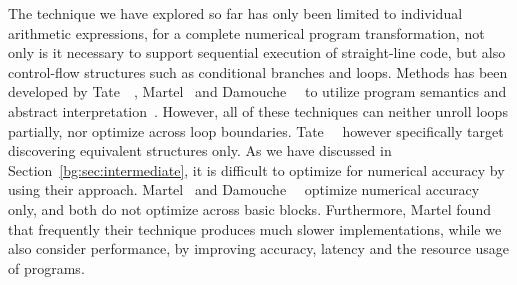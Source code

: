 The technique we have explored so far has only been limited to individual
arithmetic expressions, for a complete numerical program transformation, not
only is it necessary to support sequential execution of straight-line code,
but also control-flow structures such as conditional branches and loops.
Methods has been developed by Tate~\etal~\cite{tate09}, Martel~\cite{martel09}
and Damouche~\etal~\cite{damouche15} to utilize program semantics and
abstract interpretation~\cite{cousot77}.  However, all of these techniques
can neither unroll loops partially, nor optimize across loop boundaries.
Tate~\etal~\cite{tate09} however specifically target discovering equivalent
structures only.  As we have discussed in Section~\ref{bg:sec:intermediate},
it is difficult to optimize for numerical accuracy by using their approach.
Martel~\cite{martel09} and Damouche~\etal~\cite{damouche15} optimize
numerical accuracy only, and both do not optimize across basic blocks.
Furthermore, Martel found that frequently their technique produces much slower
implementations, while we also consider performance, by improving accuracy,
latency and the resource usage of programs.
